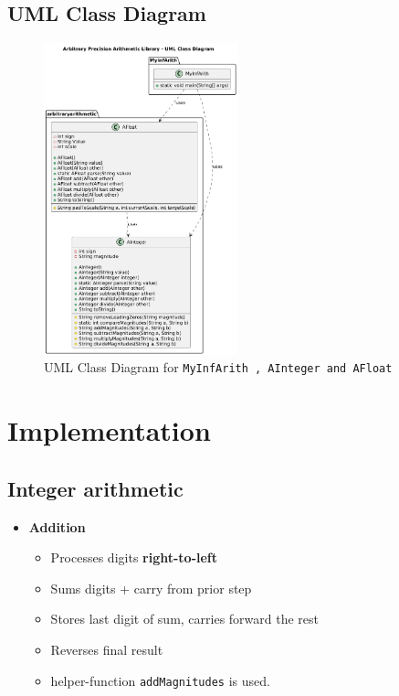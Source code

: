 \documentclass[12pt]{article}
\begin{document}
\begin{spacing}{1.2}
\subsection{UML Class Diagram}
\begin{spacing}{0.2}
\begin{figure}[h]
    \centering
    \includegraphics[width=0.5\textwidth]{UMLDiagram.png}
    \caption{UML Class Diagram for \texttt{MyInfArith , AInteger and AFloat}}
    \label{fig:your_label}
\end{figure}
\end{spacing}




\section{Implementation}
\subsection{Integer arithmetic}

\begin{itemize}[leftmargin=*]
    \item \textbf{Addition}
    \begin{itemize}
        \item Processes digits \textbf{right-to-left}
        \item Sums digits + carry from prior step
        \item Stores last digit of sum, carries forward the rest
        \item Reverses final result
        \item helper-function \texttt{addMagnitudes} is used.
    \end{itemize}


\end{itemize}
\end{spacing}
\end{document}
